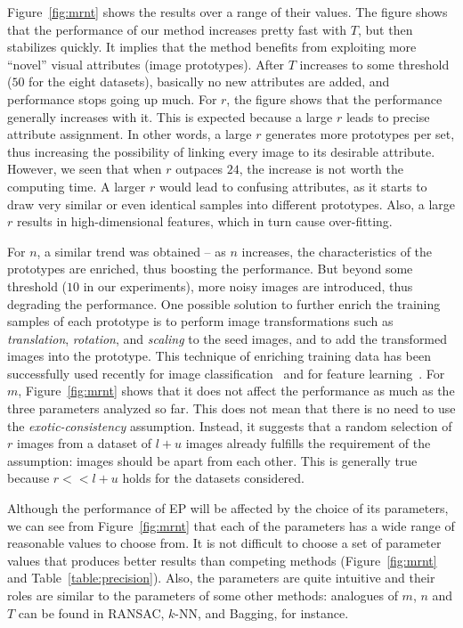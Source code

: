 \documentclass[preprint,12pt,3p]{elsarticle}
\begin{document}
Figure~\ref{fig:mrnt} shows the results over a range of their
values. The figure shows that the performance of our method increases
pretty fast with $T$, but then stabilizes quickly. It implies that the
method benefits from exploiting more ``novel'' visual attributes
(image prototypes). After $T$ increases to some threshold (\eg $50$
for the eight datasets), basically no new attributes are added, and performance stops going up much. 
For $r$, the
figure shows that the performance generally increases with it. This is
expected because a large $r$ leads to precise attribute
assignment. In other words, a large $r$ generates more
prototypes per set, thus increasing the possibility of linking every
image to its desirable attribute.  However, we seen that when $r$
outpaces $24$, the increase is not worth the computing time. A larger
$r$ would lead to confusing attributes, as it starts to draw very
similar or even identical samples into different prototypes.  Also, a
large $r$ results in high-dimensional features, which in turn
cause over-fitting. 

For $n$, a similar trend was obtained -- as $n$ increases, the
characteristics of the prototypes are enriched, thus boosting the
performance. But beyond some threshold (\eg $10$ in our experiments),
more noisy images are introduced, thus degrading the performance. One
possible solution to further enrich the training samples of each
prototype is to perform image transformations such as
\emph{translation}, \emph{rotation}, and \emph{scaling} to the seed
images, and to add the transformed images into the prototype. This
technique of enriching training data has been successfully used
recently for image classification~\citep{transformation:cvpr14} and for feature learning~\citep{cnnfet14}.  For $m$, Figure~\ref{fig:mrnt} shows
that it does not affect the performance as much as the three parameters
analyzed so far. This does not mean that there is no need to use the
\emph{exotic-consistency} assumption. Instead, it suggests that a
random selection of $r$ images from a dataset of $l+u$ images already
fulfills the requirement of the assumption: images should be apart
from each other.  This is generally true because $r << l+u$ holds for
the datasets considered.
  


Although the performance of EP will be affected by the choice of its
parameters, we can see from Figure~\ref{fig:mrnt} that each of the
parameters has a wide range of reasonable values to choose from. It is
not difficult to choose a set of parameter values that produces better
results than competing methods (\cf Figure~\ref{fig:mrnt} and
Table~\ref{table:precision}).  Also, the parameters are quite
intuitive and their roles are similar to the parameters of some
other methods: analogues of $m$, $n$ and $T$ can be found in
RANSAC, $k$-NN, and Bagging, for instance.
\end{document}
